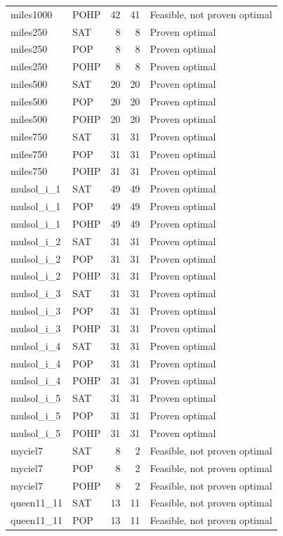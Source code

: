 \begin{longtable}{llrrl}
miles1000 & POHP & 42 & 41 & Feasible, not proven optimal \\
miles250 & SAT & 8 & 8 & Proven optimal \\
miles250 & POP & 8 & 8 & Proven optimal \\
miles250 & POHP & 8 & 8 & Proven optimal \\
miles500 & SAT & 20 & 20 & Proven optimal \\
miles500 & POP & 20 & 20 & Proven optimal \\
miles500 & POHP & 20 & 20 & Proven optimal \\
miles750 & SAT & 31 & 31 & Proven optimal \\
miles750 & POP & 31 & 31 & Proven optimal \\
miles750 & POHP & 31 & 31 & Proven optimal \\
mulsol\_i\_1 & SAT & 49 & 49 & Proven optimal \\
mulsol\_i\_1 & POP & 49 & 49 & Proven optimal \\
mulsol\_i\_1 & POHP & 49 & 49 & Proven optimal \\
mulsol\_i\_2 & SAT & 31 & 31 & Proven optimal \\
mulsol\_i\_2 & POP & 31 & 31 & Proven optimal \\
mulsol\_i\_2 & POHP & 31 & 31 & Proven optimal \\
mulsol\_i\_3 & SAT & 31 & 31 & Proven optimal \\
mulsol\_i\_3 & POP & 31 & 31 & Proven optimal \\
mulsol\_i\_3 & POHP & 31 & 31 & Proven optimal \\
mulsol\_i\_4 & SAT & 31 & 31 & Proven optimal \\
mulsol\_i\_4 & POP & 31 & 31 & Proven optimal \\
mulsol\_i\_4 & POHP & 31 & 31 & Proven optimal \\
mulsol\_i\_5 & SAT & 31 & 31 & Proven optimal \\
mulsol\_i\_5 & POP & 31 & 31 & Proven optimal \\
mulsol\_i\_5 & POHP & 31 & 31 & Proven optimal \\
myciel7 & SAT & 8 & 2 & Feasible, not proven optimal \\
myciel7 & POP & 8 & 2 & Feasible, not proven optimal \\
myciel7 & POHP & 8 & 2 & Feasible, not proven optimal \\
queen11\_11 & SAT & 13 & 11 & Feasible, not proven optimal \\
queen11\_11 & POP & 13 & 11 & Feasible, not proven optimal \\

\end{longtable}
